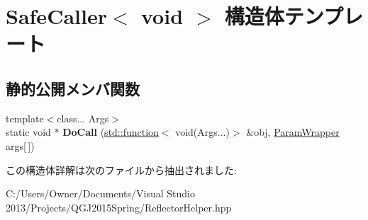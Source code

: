 \hypertarget{struct_safe_caller_3_01void_01_4}{}\section{Safe\+Caller$<$ void $>$ 構造体テンプレート}
\label{struct_safe_caller_3_01void_01_4}
\subsection*{静的公開メンバ関数}
\begin{DoxyCompactItemize}
\item 
{\footnotesize template$<$class... Args$>$ }\\static void $\ast$ {\bfseries Do\+Call} (\hyperlink{classstd_1_1function}{std\+::function}$<$ void(Args...)$>$ \&obj, \hyperlink{struct_param_wrapper}{Param\+Wrapper} args\mbox{[}$\,$\mbox{]})\hypertarget{struct_safe_caller_3_01void_01_4_a17b72053315487544d186f3b1d112134}{}\label{struct_safe_caller_3_01void_01_4_a17b72053315487544d186f3b1d112134}

\end{DoxyCompactItemize}


この構造体詳解は次のファイルから抽出されました\+:\begin{DoxyCompactItemize}
\item 
C\+:/\+Users/\+Owner/\+Documents/\+Visual Studio 2013/\+Projects/\+Q\+G\+J2015\+Spring/Reflector\+Helper.\+hpp\end{DoxyCompactItemize}
